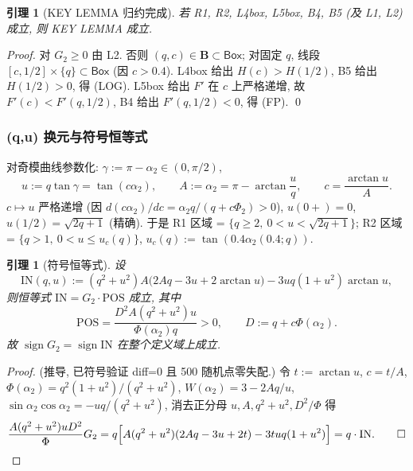 \documentclass[UTF8]{ctexart}
\newtheorem{lemma}[theorem]{引理}
\begin{document}
\begin{lemma}[KEY LEMMA 归约完成]
若 R1, R2, L4box, L5box, B4, B5 (及 L1, L2) 成立, 则 KEY LEMMA 成立.
\end{lemma}
\begin{proof}
对 $G_2\ge0$ 由 L2. 否则 $(q,c)\in\mathbf B\subset\mathsf{Box}$; 对固定 $q$,
线段 $[c,1/2]\times\{q\}\subset\mathsf{Box}$ (因 $c>0.4$). L4box 给出
$H(c)>H(1/2)$, B5 给出 $H(1/2)>0$, 得 (LOG). L5box 给出 $F'$ 在 $c$ 上严格递增,
故 $F'(c)<F'(q,1/2)$, B4 给出 $F'(q,1/2)<0$, 得 (FP). \qed
\end{proof}

\subsubsection{(q,u) 换元与符号恒等式}
对奇模曲线参数化: $\gamma:=\pi-\alpha_2\in(0,\pi/2)$,
\begin{equation}
	u:=q\tan\gamma=\tan(c\alpha_2),\qquad A:=\alpha_2=\pi-\arctan\frac uq,\qquad
	c=\frac{\arctan u}{A}.
\end{equation}
$c\mapsto u$ 严格递增 (因 $d(c\alpha_2)/dc=\alpha_2q/(q+c\Phi_2)>0$), $u(0+)=0$,
$u(1/2)=\sqrt{2q+1}$ (精确). 于是 R1 区域 = $\{q\ge2,\ 0<u<\sqrt{2q+1}\}$;
R2 区域 = $\{q>1,\ 0<u\le u_c(q)\}$, $u_c(q):=\tan(0.4\alpha_2(0.4;q))$.

\begin{lemma}[符号恒等式]
\label{lem:sign}
设
\begin{equation}
	\mathrm{IN}(q,u):=(q^2+u^2)A\bigl(2Aq-3u+2\arctan u\bigr)-3uq(1+u^2)\arctan u,
\end{equation}
则恒等式 $\mathrm{IN}=G_2\cdot\mathrm{POS}$ 成立, 其中
\begin{equation}
	\mathrm{POS}=\frac{D^2A(q^2+u^2)u}{\Phi(\alpha_2)q}>0,\qquad D:=q+c\Phi(\alpha_2).
\end{equation}
故 $\operatorname{sign}G_2=\operatorname{sign}\mathrm{IN}$ 在整个定义域上成立.
\end{lemma}
\begin{proof}
(推导, 已符号验证 diff=0 且 500 随机点零失配.) 令 $t:=\arctan u$, $c=t/A$,
$\Phi(\alpha_2)=q^2(1+u^2)/(q^2+u^2)$, $W(\alpha_2)=3-2Aq/u$,
$\sin\alpha_2\cos\alpha_2=-uq/(q^2+u^2)$, 消去正分母 $u,A,q^2+u^2,D^2/\Phi$ 得
\begin{equation}
	\frac{A(q^2+u^2)uD^2}{\Phi}G_2
	=q\Bigl[A(q^2+u^2)(2Aq-3u+2t)-3tuq(1+u^2)\Bigr]=q\cdot\mathrm{IN}.\qed
\end{equation}
\end{proof}
\end{document}
